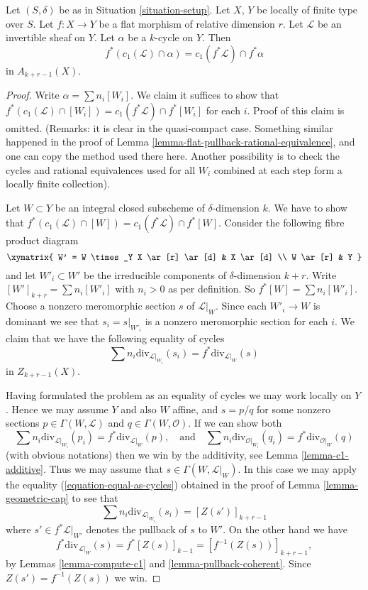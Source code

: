 \begin{lemma}
\label{lemma-flat-pullback-cap-c1}
Let $(S, \delta)$ be as in Situation \ref{situation-setup}.
Let $X$, $Y$ be locally of finite type over $S$.
Let $f : X \to Y$ be a flat morphism of relative dimension $r$.
Let $\mathcal{L}$ be an invertible sheaf on $Y$.
Let $\alpha$ be a $k$-cycle on $Y$.
Then
$$
f^*(c_1(\mathcal{L}) \cap \alpha) = c_1(f^*\mathcal{L}) \cap f^*\alpha
$$
in $A_{k + r - 1}(X)$.
\end{lemma}

\begin{proof}
Write $\alpha = \sum n_i[W_i]$. We claim it suffices to show that
$f^*(c_1(\mathcal{L}) \cap [W_i]) = c_1(f^*\mathcal{L}) \cap f^*[W_i]$
for each $i$. Proof of this claim is omitted.
(Remarks: it is clear in the quasi-compact case.
Something similar happened in the proof of
Lemma \ref{lemma-flat-pullback-rational-equivalence}, and one
can copy the method used there here. Another possibility
is to check the cycles and rational equivalences used
for all $W_i$ combined at each step form a locally finite collection).

\medskip\noindent
Let $W \subset Y$ be an integral closed subscheme of $\delta$-dimension $k$.
We have to show that
$f^*(c_1(\mathcal{L}) \cap [W]) = c_1(f^*\mathcal{L}) \cap f^*[W]$.
Consider the following fibre product diagram
$$
\xymatrix{
W' = W \times_Y X \ar[r] \ar[d] & X \ar[d] \\
W \ar[r] & Y
}
$$
and let $W'_i \subset W'$ be the irreducible components of
$\delta$-dimension $k + r$. Write
$[W']_{k + r} = \sum n_i[W'_i]$ with $n_i > 0$ as per definition.
So $f^*[W] = \sum n_i[W'_i]$. Choose a nonzero meromorphic section
$s$ of $\mathcal{L}|_W$. Since each $W'_i \to W$ is dominant we
see that $s_i = s|_{W'_i}$ is a nonzero meromorphic section for
each $i$. We claim that we have the following equality of
cycles
$$
\sum n_i\text{div}_{\mathcal{L}|_{W_i}}(s_i)
=
f^*\text{div}_{\mathcal{L}|_W}(s)
$$
in $Z_{k + r - 1}(X)$.

\medskip\noindent
Having formulated the problem as an equality of cycles
we may work locally on $Y$. Hence we may assume
$Y$ and also $W$ affine, and $s = p/q$ for some
nonzero sections $p \in \Gamma(W, \mathcal{L})$
and $q \in \Gamma(W, \mathcal{O})$. If we can show both
$$
\sum n_i\text{div}_{\mathcal{L}|_{W_i}}(p_i)
=
f^*\text{div}_{\mathcal{L}|_W}(p),
\quad\text{and}\quad
\sum n_i\text{div}_{\mathcal{O}|_{W_i}}(q_i)
=
f^*\text{div}_{\mathcal{O}|_W}(q)
$$
(with obvious notations) then we win by the
additivity, see Lemma \ref{lemma-c1-additive}.
Thus we may assume that $s \in \Gamma(W, \mathcal{L}|_W)$.
In this case we may apply the equality
(\ref{equation-equal-as-cycles}) obtained in the proof of
Lemma \ref{lemma-geometric-cap} to see that
$$
\sum n_i\text{div}_{\mathcal{L}|_{W_i}}(s_i)
=
[Z(s')]_{k + r - 1}
$$
where $s' \in f^*\mathcal{L}|_{W'}$ denotes the pullback
of $s$ to $W'$. On the other hand we have
$$
f^*\text{div}_{\mathcal{L}|_W}(s) = f^*[Z(s)]_{k - 1}
= [f^{-1}(Z(s))]_{k + r - 1},
$$
by Lemmas \ref{lemma-compute-c1} and \ref{lemma-pullback-coherent}.
Since $Z(s') = f^{-1}(Z(s))$ we win.
\end{proof}


